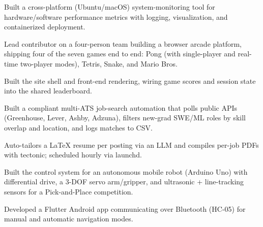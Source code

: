 \documentclass[a4paper,10pt]{article}
\begin{document}
\begin{cvitems}
  \item Built a cross-platform (Ubuntu/macOS) system-monitoring tool for
        hardware/software performance metrics with logging, visualization, and
        containerized deployment.
\end{cvitems}


\begin{cvitems}
  \item Lead contributor on a four-person team building a browser arcade
        platform, shipping four of the seven games end to end: Pong (with
        single-player and real-time two-player modes), Tetris, Snake, and
        Mario Bros.
  \item Built the site shell and front-end rendering, wiring game scores and
        session state into the shared leaderboard.
\end{cvitems}

\begin{cvitems}
  \item Built a compliant multi-ATS job-search automation that polls public APIs
        (Greenhouse, Lever, Ashby, Adzuna), filters new-grad SWE/ML roles by
        skill overlap and location, and logs matches to CSV.
  \item Auto-tailors a \LaTeX{} resume per posting via an LLM and compiles
        per-job PDFs with tectonic; scheduled hourly via launchd.
\end{cvitems}

\begin{cvitems}
  \item Built the control system for an autonomous mobile robot (Arduino Uno)
        with differential drive, a 3-DOF servo arm/gripper, and ultrasonic +
        line-tracking sensors for a Pick-and-Place competition.
  \item Developed a Flutter Android app communicating over Bluetooth (HC-05) for
        manual and automatic navigation modes.
\end{cvitems}
\end{document}
